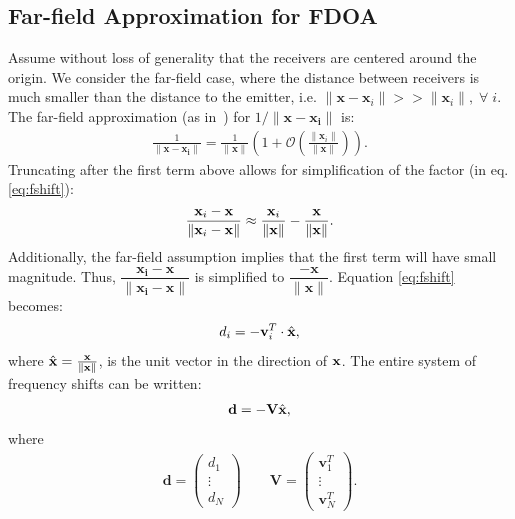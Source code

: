 \subsection{Far-field Approximation for FDOA}
Assume without loss of generality that the receivers are centered around the origin. We consider the far-field case, where the distance between receivers is much smaller than the distance to the emitter, i.e. $\|\mathbf{x}-\mathbf{x}_i\|>>\|\mathbf{x}_i\|, \; \forall \; i$. The far-field approximation (as in~\cite{Cheney2009}) for $1/\|\mathbf{x-x_i}\|$ is:
\begin{align*}
  \frac{1}{\|\mathbf{x-x_i}\|} = \frac{1}{\|\mathbf{x}\|}\left(1+\mathcal{O}\left(\frac{\|\mathbf{x}_i\|}{\|\mathbf{x}\|}\right)\right).
\end{align*}
Truncating after the first term above allows for simplification of the factor (in eq. \ref{eq:fshift}):
\begin{align*}
  \frac{\mathbf{x}_i-\mathbf{x}}{\|\mathbf{x}_i-\mathbf{x}\|} \approx \frac{\mathbf{x}_i}{\|\mathbf{x}\|}-\frac{\mathbf{x}}{\|\mathbf{x}\|}.
\end{align*}
Additionally, the far-field assumption implies that the first term will have small magnitude. Thus, $\dfrac{\mathbf{x_i-x}}{\|\mathbf{x_i-x}\|}$ is simplified to $\dfrac{-\mathbf{x}}{\|\mathbf{x}\|}$.
Equation \ref{eq:fshift} becomes:
\begin{align}
  d_i =  -\mathbf{v}_i^T\cdot\hat{\mathbf{x}},
\end{align}
where $\hat{\mathbf{x}} = \frac{\mathbf{x}}{\|\mathbf{x}\|}$, is the unit vector in the direction of $\mathbf{x}$. The entire system of frequency shifts can be written:
\begin{align}
  \label{eq:fshiftFF}
\mathbf{d} = -\mathbf{V}\hat{\mathbf{x}},
\end{align}
where \begin{align*}
\mathbf{d}=\begin{pmatrix}
d_1 \\ \vdots \\ d_N
\end{pmatrix}
\qquad
\mathbf{V}=\begin{pmatrix}
\mathbf{v}_1^T \\ \vdots\\ \mathbf{v}_N^T
\end{pmatrix}.
\end{align*}

